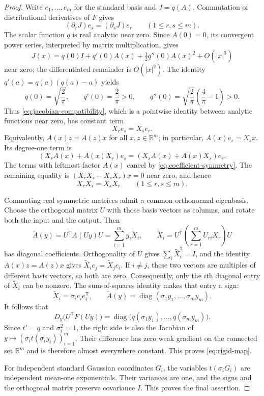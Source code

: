 \documentclass[11pt]{article}
\theoremstyle{definition}
\theoremstyle{remark}
\numberwithin{equation}{section}
\begin{document}
\begin{proof}
Write $e_1,\ldots,e_m$ for the standard basis and $J=q(A)$.
Commutation of distributional derivatives of $F$ gives
\begin{equation}\label{eq:jacobian-compatibility}
  (\partial_rJ)e_s=(\partial_sJ)e_r
  \qquad(1\le r,s\le m).
\end{equation}
The scalar function $q$ is real analytic near zero.  Since $A(0)=0$, its
convergent power series, interpreted by matrix multiplication, gives
\[
  J(x)=q(0)I+q'(0)A(x)+\tfrac12q''(0)A(x)^2+O(|x|^3)
\]
near zero; the differentiated remainder is $O(|x|^2)$.
The identity $q'(a)=q(a)(q(a)-a)$ yields
\[
  q(0)=\sqrt{\frac2\pi},\qquad
  q'(0)=\frac2\pi>0,\qquad
  q''(0)=\sqrt{\frac2\pi}\left(\frac4\pi-1\right)>0.
\]
Thus \eqref{eq:jacobian-compatibility}, which is a pointwise identity
between analytic functions near zero, has constant term
\begin{equation}\label{eq:coefficient-symmetry}
  X_re_s=X_se_r.
\end{equation}
Equivalently, $A(x)z=A(z)x$ for all $x,z\in\mathbb R^m$; in particular,
$A(x)e_s=X_sx$.  Its degree-one term is
\[
  (X_rA(x)+A(x)X_r)e_s
  =(X_sA(x)+A(x)X_s)e_r.
\]
The terms with leftmost factor $A(x)$ cancel by
\eqref{eq:coefficient-symmetry}.  The remaining equality is
$(X_rX_s-X_sX_r)x=0$ near zero, and hence
\begin{equation}\label{eq:coefficients-commute}
  X_rX_s=X_sX_r\qquad(1\le r,s\le m).
\end{equation}

Commuting real symmetric matrices admit a common orthonormal eigenbasis.
Choose the orthogonal matrix $U$ with those basis vectors as columns,
and rotate both the input and the output.  Then
\[
  \widetilde A(y)=U^{\mathsf T}A(Uy)U
     =\sum_{i=1}^m y_i\widetilde X_i,
  \qquad
  \widetilde X_i=U^{\mathsf T}
      \left(\sum_{r=1}^m U_{ri}X_r\right)U
\]
has diagonal coefficients.  Orthogonality of $U$ gives
$\sum_i\widetilde X_i^2=I$, and the identity $A(x)z=A(z)x$ gives
$\widetilde X_i e_j=\widetilde X_j e_i$.  If $i\ne j$, these two vectors
are multiples of different basis vectors, so both are zero.
Consequently, only the $i$th diagonal entry of $\widetilde X_i$ can be
nonzero.  The sum-of-squares identity makes that entry a sign:
\[
  \widetilde X_i=\sigma_i e_ie_i^{\mathsf T},
  \qquad
  \widetilde A(y)=\operatorname{diag}(\sigma_1y_1,\ldots,\sigma_my_m).
\]
It follows that
\[
  D_y\bigl(U^{\mathsf T}F(Uy)\bigr)
   =\operatorname{diag}\bigl(q(\sigma_1y_1),\ldots,q(\sigma_my_m)\bigr).
\]
Since $t'=q$ and $\sigma_i^2=1$, the right side is also the Jacobian of
$y\mapsto(\sigma_i t(\sigma_i y_i))_{i=1}^m$.
Their difference has zero weak gradient on the connected set $\mathbb R^m$
and is therefore almost everywhere constant.  This proves
\eqref{eq:rigid-map}.

For independent standard Gaussian coordinates $G_i$, the variables
$t(\sigma_iG_i)$ are independent mean-one exponentials.  Their variances
are one, and the signs and the orthogonal matrix preserve covariance
$I$.  This proves the final assertion.
\end{proof}
\end{document}
